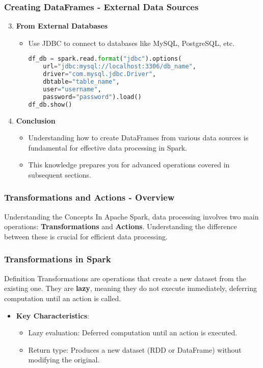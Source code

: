 \documentclass[aspectratio=169]{beamer}
\begin{document}
\begin{frame}[fragile]
    \frametitle{Creating DataFrames - External Data Sources}
    \begin{enumerate}
        \setcounter{enumi}{2}
        \item \textbf{From External Databases}
        \begin{itemize}
            \item Use JDBC to connect to databases like MySQL, PostgreSQL, etc.
            \begin{lstlisting}[language=Python]
df_db = spark.read.format("jdbc").options(
    url="jdbc:mysql://localhost:3306/db_name",
    driver="com.mysql.jdbc.Driver",
    dbtable="table_name",
    user="username",
    password="password").load()
df_db.show()
            \end{lstlisting}
        \end{itemize}
        
        \item \textbf{Conclusion}
        \begin{itemize}
            \item Understanding how to create DataFrames from various data sources is fundamental for effective data processing in Spark.
            \item This knowledge prepares you for advanced operations covered in subsequent sections.
        \end{itemize}
    \end{enumerate}
\end{frame}

\begin{frame}[fragile]
  \frametitle{Transformations and Actions - Overview}
  \begin{block}{Understanding the Concepts}
    In Apache Spark, data processing involves two main operations: \textbf{Transformations} and \textbf{Actions}. Understanding the difference between these is crucial for efficient data processing.
  \end{block}
\end{frame}

\begin{frame}[fragile]
  \frametitle{Transformations in Spark}
  \begin{block}{Definition}
    Transformations are operations that create a new dataset from the existing one. They are \textbf{lazy}, meaning they do not execute immediately, deferring computation until an action is called.
  \end{block}
  
  \begin{itemize}
    \item \textbf{Key Characteristics}:
    \begin{itemize}
      \item Lazy evaluation: Deferred computation until an action is executed.
      \item Return type: Produces a new dataset (RDD or DataFrame) without modifying the original.
    \end{itemize}
  \end{itemize}
\end{frame}
\end{document}
